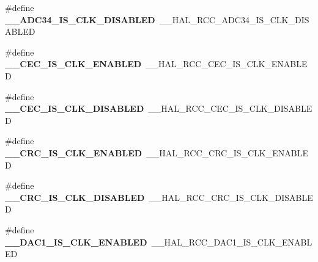 \begin{DoxyCompactItemize}
\item 
\hypertarget{group___h_a_l___r_c_c___aliased_ga93f6d4d2538e3cffb09d7ceda988c85c}{\#define {\bfseries \-\_\-\-\_\-\-A\-D\-C34\-\_\-\-I\-S\-\_\-\-C\-L\-K\-\_\-\-D\-I\-S\-A\-B\-L\-E\-D}~\-\_\-\-\_\-\-H\-A\-L\-\_\-\-R\-C\-C\-\_\-\-A\-D\-C34\-\_\-\-I\-S\-\_\-\-C\-L\-K\-\_\-\-D\-I\-S\-A\-B\-L\-E\-D}\label{group___h_a_l___r_c_c___aliased_ga93f6d4d2538e3cffb09d7ceda988c85c}

\item 
\hypertarget{group___h_a_l___r_c_c___aliased_gaa689c0774ae390c72456584c62c95e7d}{\#define {\bfseries \-\_\-\-\_\-\-C\-E\-C\-\_\-\-I\-S\-\_\-\-C\-L\-K\-\_\-\-E\-N\-A\-B\-L\-E\-D}~\-\_\-\-\_\-\-H\-A\-L\-\_\-\-R\-C\-C\-\_\-\-C\-E\-C\-\_\-\-I\-S\-\_\-\-C\-L\-K\-\_\-\-E\-N\-A\-B\-L\-E\-D}\label{group___h_a_l___r_c_c___aliased_gaa689c0774ae390c72456584c62c95e7d}

\item 
\hypertarget{group___h_a_l___r_c_c___aliased_ga737ee1eac2e1da1c1296e4d61254af98}{\#define {\bfseries \-\_\-\-\_\-\-C\-E\-C\-\_\-\-I\-S\-\_\-\-C\-L\-K\-\_\-\-D\-I\-S\-A\-B\-L\-E\-D}~\-\_\-\-\_\-\-H\-A\-L\-\_\-\-R\-C\-C\-\_\-\-C\-E\-C\-\_\-\-I\-S\-\_\-\-C\-L\-K\-\_\-\-D\-I\-S\-A\-B\-L\-E\-D}\label{group___h_a_l___r_c_c___aliased_ga737ee1eac2e1da1c1296e4d61254af98}

\item 
\hypertarget{group___h_a_l___r_c_c___aliased_ga134978ca782086807d3340e1d9bc5c70}{\#define {\bfseries \-\_\-\-\_\-\-C\-R\-C\-\_\-\-I\-S\-\_\-\-C\-L\-K\-\_\-\-E\-N\-A\-B\-L\-E\-D}~\-\_\-\-\_\-\-H\-A\-L\-\_\-\-R\-C\-C\-\_\-\-C\-R\-C\-\_\-\-I\-S\-\_\-\-C\-L\-K\-\_\-\-E\-N\-A\-B\-L\-E\-D}\label{group___h_a_l___r_c_c___aliased_ga134978ca782086807d3340e1d9bc5c70}

\item 
\hypertarget{group___h_a_l___r_c_c___aliased_ga8fc4c0275c6936b2f636c3bb4dc48385}{\#define {\bfseries \-\_\-\-\_\-\-C\-R\-C\-\_\-\-I\-S\-\_\-\-C\-L\-K\-\_\-\-D\-I\-S\-A\-B\-L\-E\-D}~\-\_\-\-\_\-\-H\-A\-L\-\_\-\-R\-C\-C\-\_\-\-C\-R\-C\-\_\-\-I\-S\-\_\-\-C\-L\-K\-\_\-\-D\-I\-S\-A\-B\-L\-E\-D}\label{group___h_a_l___r_c_c___aliased_ga8fc4c0275c6936b2f636c3bb4dc48385}

\item 
\hypertarget{group___h_a_l___r_c_c___aliased_ga167f94eac0b5ff0a51306a69365c4956}{\#define {\bfseries \-\_\-\-\_\-\-D\-A\-C1\-\_\-\-I\-S\-\_\-\-C\-L\-K\-\_\-\-E\-N\-A\-B\-L\-E\-D}~\-\_\-\-\_\-\-H\-A\-L\-\_\-\-R\-C\-C\-\_\-\-D\-A\-C1\-\_\-\-I\-S\-\_\-\-C\-L\-K\-\_\-\-E\-N\-A\-B\-L\-E\-D}\label{group___h_a_l___r_c_c___aliased_ga167f94eac0b5ff0a51306a69365c4956}


\end{DoxyCompactItemize}
